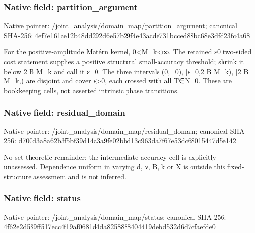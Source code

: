 \documentclass[10pt,a4paper]{article}
\begin{document}
\subsubsection{Native field: partition\_\allowbreak{}argument}
Native pointer: /joint\_\allowbreak{}analysis/domain\_\allowbreak{}map/partition\_\allowbreak{}argument; canonical SHA-256: 4ef7e161ae12b48dd292d6e57b29f4e43acde731bcced88bc68e3dfd23fc4a68

\begingroup\raggedright\sloppy For the positive-amplitude Mat{\AtlasUnicodeText é}\allowbreak{}rn kernel,\allowbreak{} 0<M\_\allowbreak{}k<{\AtlasUnicodeSymbols ∞}\allowbreak{}. The retained {\AtlasUnicodeText ε}\allowbreak{}0 two-sided cost statement supplies a positive structural small-accuracy threshold;\allowbreak{} shrink it below 2 B M\_\allowbreak{}k and call it {\AtlasUnicodeText ε}\allowbreak{}\_\allowbreak{}0. The three intervals (0,\allowbreak{}\_\allowbreak{}0),\allowbreak{} [{\AtlasUnicodeText ε}\allowbreak{}\_\allowbreak{}0,\allowbreak{}2 B M\_\allowbreak{}k),\allowbreak{} [2 B M\_\allowbreak{}k,\allowbreak{}) are disjoint and cover {\AtlasUnicodeText ε}\allowbreak{}>0,\allowbreak{} each crossed with all T{\AtlasUnicodeSymbols ∈}\allowbreak{}N\_\allowbreak{}0. These are bookkeeping cells,\allowbreak{} not asserted intrinsic phase transitions.\par\endgroup

\subsubsection{Native field: residual\_\allowbreak{}domain}
Native pointer: /joint\_\allowbreak{}analysis/domain\_\allowbreak{}map/residual\_\allowbreak{}domain; canonical SHA-256: d700d3a8a62b3f5bf39d14a3a9fe02bbd13c963da7f67e53dc68015447d5e142

\begingroup\raggedright\sloppy No set-theoretic remainder:\allowbreak{} the intermediate-accuracy cell is explicitly unassessed. Dependence uniform in varying d,\allowbreak{} {\AtlasUnicodeText ν}\allowbreak{},\allowbreak{} B,\allowbreak{} k or X is outside this fixed-structure assessment and is not inferred.\par\endgroup

\subsubsection{Native field: status}
Native pointer: /joint\_\allowbreak{}analysis/domain\_\allowbreak{}map/status; canonical SHA-256: 4f62e2d589ff517ecc4f19af0681d4da8258888404419debd532d6d7cfaefde0
\end{document}
